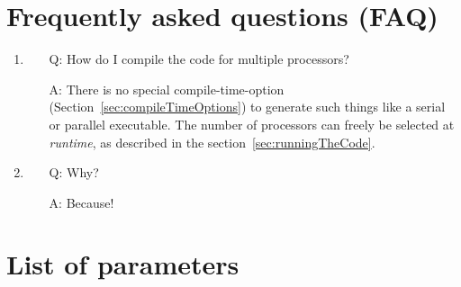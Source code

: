 \documentclass[a4paper, 11pt, DIV=11]{scrartcl}
\begin{document}
\section{Frequently asked questions (FAQ)}
\label{sec:faq}



\begin{enumerate}
\item
\begin{itemize}
\item[Q:] How do I compile the code for multiple processors?
\item[A:] There is no special compile-time-option (Section~\ref{sec:compileTimeOptions}) to
generate such things like a serial or parallel executable. The number of processors can
freely be selected at \textit{runtime}, as described in the section~\ref{sec:runningTheCode}.
\end{itemize}

\item
\begin{itemize}
\item[Q:] Why?
\item[A:] Because!
\end{itemize}

\end{enumerate}




\appendix



\section{List of parameters}
\label{sec:listOfParameters}
\end{document}
